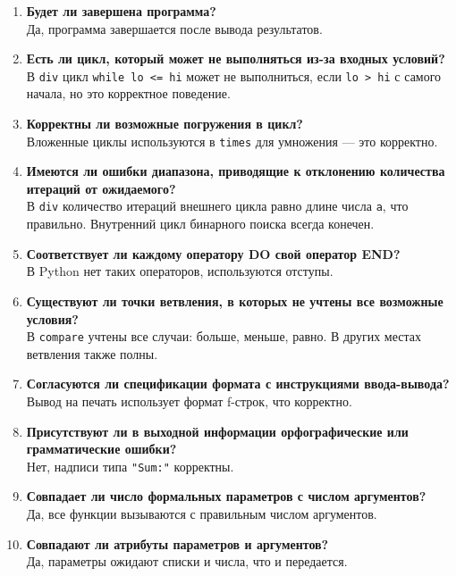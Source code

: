 \documentclass{article}[14pt]
\begin{document}
\begin{enumerate}
\item \textbf{Будет ли завершена программа?}
\\
Да, программа завершается после вывода результатов.

\item \textbf{Есть ли цикл, который может не выполняться из-за входных условий?}
\\
В \texttt{div} цикл \texttt{while lo <= hi} может не выполниться, если \texttt{lo > hi} с самого начала, но это корректное поведение.

\item \textbf{Корректны ли возможные погружения в цикл?}
\\
Вложенные циклы используются в \texttt{times} для умножения — это корректно.

\item \textbf{Имеются ли ошибки диапазона, приводящие к отклонению количества итераций от ожидаемого?}
\\
В \texttt{div} количество итераций внешнего цикла равно длине числа \texttt{a}, что правильно. Внутренний цикл бинарного поиска всегда конечен.

\item \textbf{Соответствует ли каждому оператору DO свой оператор END?}
\\
В Python нет таких операторов, используются отступы.

\item \textbf{Существуют ли точки ветвления, в которых не учтены все возможные условия?}
\\
В \texttt{compare} учтены все случаи: больше, меньше, равно. В других местах ветвления также полны.

\item \textbf{Согласуются ли спецификации формата с инструкциями ввода-вывода?}
\\
Вывод на печать использует формат f-строк, что корректно.

\item \textbf{Присутствуют ли в выходной информации орфографические или грамматические ошибки?}
\\
Нет, надписи типа \texttt{"Sum:"} корректны.

\item \textbf{Совпадает ли число формальных параметров с числом аргументов?}
\\
Да, все функции вызываются с правильным числом аргументов.

\item \textbf{Совпадают ли атрибуты параметров и аргументов?}
\\
Да, параметры ожидают списки и числа, что и передается.


\end{enumerate}
\end{document}
